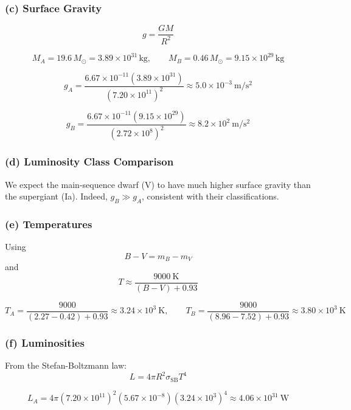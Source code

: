 \documentclass{article}
\begin{document}
\subsubsection*{(c) Surface Gravity}

\[
g = \frac{GM}{R^2}
\]

\[
M_A = 19.6\,M_\odot = 3.89\times10^{31}\,\mathrm{kg}, \qquad
M_B = 0.46\,M_\odot = 9.15\times10^{29}\,\mathrm{kg}
\]

\[
g_A = \frac{6.67\times10^{-11}(3.89\times10^{31})}{(7.20\times10^{11})^2}
     \boxed{\approx 5.0\times10^{-3}~\mathrm{m/s^2}}
\]

\[
g_B = \frac{6.67\times10^{-11}(9.15\times10^{29})}{(2.72\times10^{8})^2}
     \boxed{\approx 8.2\times10^{2}~\mathrm{m/s^2}}
\]

\subsubsection*{(d) Luminosity Class Comparison}

We expect the main-sequence dwarf (V) to have much higher surface gravity than the supergiant (Ia).  
Indeed, $g_B \gg g_A$, consistent with their classifications.

\subsubsection*{(e) Temperatures}

Using
\begin{equation}
B - V = m_B - m_V
\tag{13.35}
\end{equation}
and
\begin{equation}
T \approx \frac{9000~\mathrm{K}}{(B - V) + 0.93}
\tag{13.36}
\end{equation}

\[
T_A = \frac{9000}{(2.27 - 0.42) + 0.93} \boxed{\approx 3.24\times10^{3}~\mathrm{K}}, \qquad
T_B = \frac{9000}{(8.96 - 7.52) + 0.93} \boxed{\approx 3.80\times10^{3}~\mathrm{K}}
\]

\subsubsection*{(f) Luminosities}

From the Stefan-Boltzmann law:
\[
L = 4\pi R^2\sigma_\mathrm{SB}T^4
\]

\[
L_A = 4\pi(7.20\times10^{11})^2(5.67\times10^{-8})(3.24\times10^{3})^4
     \boxed{\approx 4.06\times10^{31}~\mathrm{W}}
\]
\end{document}
